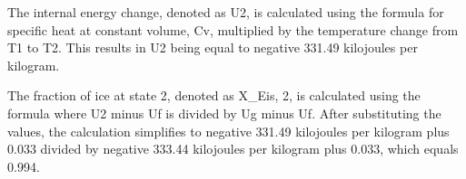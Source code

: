 The internal energy change, denoted as U2, is calculated using the formula for specific heat at constant volume, Cv, multiplied by the temperature change from T1 to T2. This results in U2 being equal to negative 331.49 kilojoules per kilogram.

The fraction of ice at state 2, denoted as X_{Eis, 2}, is calculated using the formula where U2 minus Uf is divided by Ug minus Uf. After substituting the values, the calculation simplifies to negative 331.49 kilojoules per kilogram plus 0.033 divided by negative 333.44 kilojoules per kilogram plus 0.033, which equals 0.994.